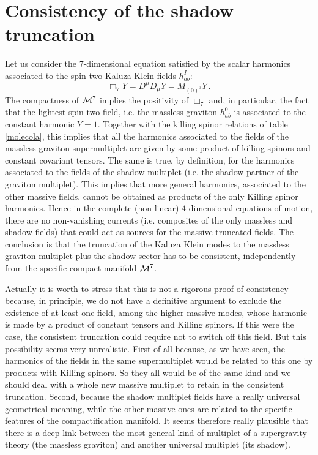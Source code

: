 \documentclass[a4paper,11pt]{article}
\begin{document}
\section{Consistency of the shadow truncation}
Let us consider the $7$-dimensional equation satisfied by the
scalar harmonics associated to the spin two Kaluza Klein fields
$h^I_{ab}$:
\begin{equation}
  \Box_7 Y = D^\mu D_\mu Y = M_{(0)^3} Y\,.
\end{equation}
The compactness of ${\cal M}^7$ implies the positivity of $\Box_7$
and, in particular, the fact that the lightest spin two field,
i.e. the massless graviton $h^0_{ab}$ is associated to the
constant harmonic $Y=1$. Together with the killing spinor
relations of table \ref{molecola}, this implies that all the
harmonics associated to the fields of the massless graviton
supermultiplet are given by some product of killing spinors and
constant covariant tensors. The same is true, by definition, for
the harmonics associated to the fields of the shadow multiplet
(i.e. the shadow partner of the graviton multiplet). This implies
that more general harmonics, associated to the other massive
fields, cannot be obtained as products of the only Killing spinor
harmonics. Hence in the complete (non-linear) $4$-dimensional
equations of motion, there are no non-vanishing currents (i.e.
composites of the only massless and shadow fields) that could act
as sources for the massive truncated fields. The conclusion is
that the truncation of the Kaluza Klein modes to the massless
graviton multiplet plus the shadow sector has to be consistent,
independently from the specific compact manifold ${\cal M}^7$.
\par
Actually it is worth to stress that this is not a rigorous proof
of consistency because, in principle, we do not have a definitive
argument to exclude the existence of at least one field, among the
higher massive modes, whose harmonic is made by a product of
constant tensors and Killing spinors. If this were the case, the
consistent truncation could require not to switch off this field.
But this possibility seems very unrealistic. First of all because,
as we have seen, the harmonics of the fields in the same
supermultiplet would be related to this one by products with
Killing spinors. So they all would be of the same kind and we
should deal with a whole new massive multiplet to retain in the
consistent truncation. Second, because the shadow multiplet fields
have a really universal geometrical meaning, while the other
massive ones are related to the specific features of the
compactification manifold. It seems therefore really plausible
that there is a deep link between the most general kind of
multiplet of a supergravity theory (the massless graviton) and
another universal multiplet (its shadow).
%
%
\end{document}
